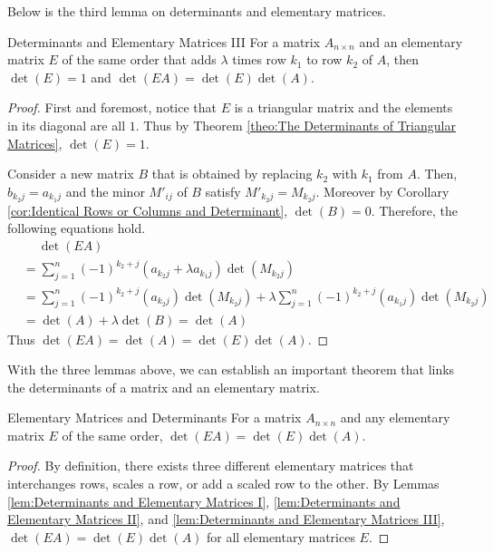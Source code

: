 \documentclass[../main.tex]{subfiles}
\begin{document}
Below is the third lemma on determinants and elementary matrices.

\begin{lemma}{Determinants and Elementary Matrices III}
For a matrix $A_{n \times n}$ and an elementary matrix $E$ of
the same order that adds $\lambda$ times row $k_1$ to row $k_2$
of $A$, then $\det(E) = 1$ and $\det(EA) = \det(E) \det(A)$.
\end{lemma}
\begin{proof}
First and foremost, notice that $E$ is a triangular matrix and
the elements in its diagonal are all $1$. Thus by Theorem
\ref{theo:The Determinants of Triangular Matrices}, $\det(E) = 1$.

Consider a new matrix $B$ that is obtained by replacing $k_2$
with $k_1$ from $A$. Then, $b_{k_2j} = a_{k_1j}$ and the minor
$M'_{ij}$ of $B$ satisfy $M'_{k_2j} = M_{k_2j}$. Moreover by Corollary
\ref{cor:Identical Rows or Columns and Determinant}, $\det(B) = 0$.
Therefore, the following equations hold.
\begin{align*}
    &\quad\ \det(EA) \\
    &= \sum_{j=1}^n (-1)^{k_2 + j} (a_{k_2j} + \lambda a_{k_1j})
        \det(M_{k_2j}) \\
    &= \sum_{j=1}^n (-1)^{k_2 + j} (a_{k_2j}) \det(M_{k_2j}) +
        \lambda \sum_{j=1}^n (-1)^{k_2 + j} (a_{k_1j})
            \det(M_{k_2j}) \\
    &= \det(A) + \lambda \det(B)
    = \det(A)
\end{align*}
Thus $\det(EA) = \det(A) = \det(E) \det(A)$.
\end{proof}

With the three lemmas above, we can establish an important theorem
that links the determinants of a matrix and an elementary matrix.

\begin{theorem}{Elementary Matrices and Determinants}
For a matrix $A_{n \times n}$ and any elementary matrix $E$ of the
same order, $\det(EA) = \det(E) \det(A)$.
\end{theorem}
\begin{proof}
By definition, there exists three different elementary matrices that
interchanges rows, scales a row, or add a scaled row to the other.
By Lemmas \ref{lem:Determinants and Elementary Matrices I},
\ref{lem:Determinants and Elementary Matrices II}, and
\ref{lem:Determinants and Elementary Matrices III}, $\det(EA) =
\det(E) \det(A)$ for all elementary matrices $E$.
\end{proof}
\end{document}
